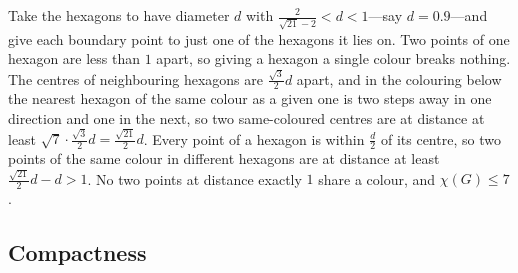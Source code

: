 Take the hexagons to have diameter $d$ with $\frac{2}{\sqrt{21} - 2} < d < 1$---say $d = 0.9$---and give each boundary point to just one of the hexagons it lies on. Two points of one hexagon are less than $1$ apart, so giving a hexagon a single colour breaks nothing. The centres of neighbouring hexagons are $\frac{\sqrt{3}}{2} d$ apart, and in the colouring below the nearest hexagon of the same colour as a given one is two steps away in one direction and one in the next, so two same-coloured centres are at distance at least $\sqrt{7} \cdot \frac{\sqrt{3}}{2} d = \frac{\sqrt{21}}{2} d$. Every point of a hexagon is within $\frac{d}{2}$ of its centre, so two points of the same colour in different hexagons are at distance at least $\frac{\sqrt{21}}{2} d - d > 1$. No two points at distance exactly $1$ share a colour, and $\chi(G) \leq 7$.
\begin{figure}[H]
    \centering
\end{figure}

\subsection{Compactness}

